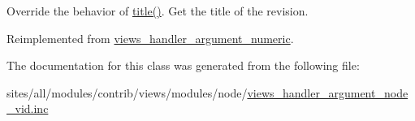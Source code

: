Override the behavior of \hyperlink{classviews__handler__argument__numeric_480758dbcde899b5483b091e51e2bf39}{title()}. Get the title of the revision. 

Reimplemented from \hyperlink{classviews__handler__argument__numeric_5c6f566b06bad6057e92f15d82311c7b}{views\_\-handler\_\-argument\_\-numeric}.

The documentation for this class was generated from the following file:\begin{CompactItemize}
\item 
sites/all/modules/contrib/views/modules/node/\hyperlink{views__handler__argument__node__vid_8inc}{views\_\-handler\_\-argument\_\-node\_\-vid.inc}\end{CompactItemize}
